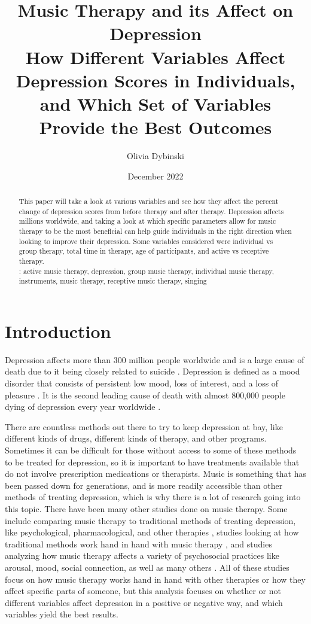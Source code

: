 \documentclass[12pt]{article}
\title{Music Therapy and its Affect on Depression \\[1ex] \large How Different Variables Affect Depression Scores in Individuals, and Which Set of Variables Provide the Best Outcomes}
\author{Olivia Dybinski\\}
\date{December 2022}
\begin{document}
  \maketitle

 \begin{abstract}
 \label{sec:abstract}

 This paper will take a look at various variables and see how they affect the percent change of depression scores from before therapy and after therapy. Depression affects millions worldwide, and taking a look at which specific parameters allow for music therapy to be the most beneficial can help guide individuals in the right direction when looking to improve their depression. Some variables considered were individual vs group therapy, total time in therapy, age of participants, and active vs receptive therapy. \\
 
 :
 active music therapy, depression, group music therapy, individual music therapy, instruments, music therapy, receptive music therapy, singing

\end{abstract}

 \section{Introduction} 
 \label{sec:introduction}

 Depression affects more than 300 million people worldwide and is a large cause of death due to it being closely related to suicide \citet{PLOS}. Depression is defined as a mood disorder that consists of persistent low mood, loss of interest, and a loss of pleasure \citet{Cochrane}. It is the second leading cause of death with almost 800,000 people dying of depression every year worldwide \citet{PLOS}. 

 There are countless methods out there to try to keep depression at bay, like different kinds of drugs, different kinds of therapy, and other programs. Sometimes it can be difficult for those without access to some of these methods to be treated for depression, so it is important to have treatments available that do not involve prescription medications or therapists. Music is something that has been passed down for generations, and is more readily accessible than other methods of treating depression, which is why there is a lot of research going into this topic. There have been many other studies done on music therapy. Some include comparing music therapy to traditional methods of treating depression, like psychological, pharmacological, and other therapies \citet{Cochrane}, studies looking at how traditional methods work hand in hand with music therapy \citet{British}, and studies analyzing how music therapy affects a variety of psychosocial practices like arousal, mood, social connection, as well as many others \citet{Frontiers}. All of these studies focus on how music therapy works hand in hand with other therapies or how they affect specific parts of someone, but this analysis focuses on whether or not different variables affect depression in a positive or negative way, and which variables yield the best results. 
\end{document}
